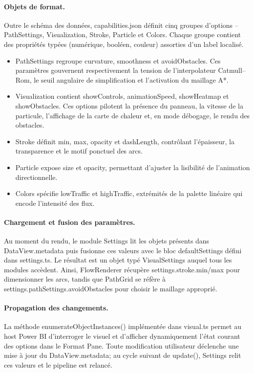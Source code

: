 \paragraph{Objets de format.} Outre le schéma des données, capabilities.json définit cinq groupes d’options – PathSettings, Visualization, Stroke, Particle et Colors. Chaque groupe contient des propriétés typées (numérique, booléen, couleur) assorties d’un label localisé.
\begin{itemize}
  \item PathSettings regroupe curvature, smoothness et avoidObstacles. Ces paramètres gouvernent respectivement la tension de l’interpolateur Catmull–Rom, le seuil angulaire de simplification et l’activation du maillage A*.
  \item Visualization contient showControls, animationSpeed, showHeatmap et showObstacles. Ces options pilotent la présence du panneau, la vitesse de la particule, l’affichage de la carte de chaleur et, en mode débogage, le rendu des obstacles.
  \item Stroke définit min, max, opacity et dashLength, contrôlant l’épaisseur, la transparence et le motif ponctuel des arcs.
  \item Particle expose size et opacity, permettant d’ajuster la lisibilité de l’animation directionnelle.
  \item Colors spécifie lowTraffic et highTraffic, extrémités de la palette linéaire qui encode l’intensité des flux.
\end{itemize}

\paragraph{Chargement et fusion des paramètres.} Au moment du rendu, le module Settings lit les objets présents dans DataView.metadata puis fusionne ces valeurs avec le bloc defaultSettings défini dans settings.ts. Le résultat est un objet typé VisualSettings auquel tous les modules accèdent. Ainsi, FlowRenderer récupère settings.stroke.min/max pour dimensionner les arcs, tandis que PathGrid se réfère à settings.pathSettings.avoidObstacles pour choisir le maillage approprié.

\paragraph{Propagation des changements.} La méthode enumerateObjectInstances() implémentée dans visual.ts permet au host Power BI d’interroger le visuel et d’afficher dynamiquement l’état courant des options dans le Format Pane. Toute modification utilisateur déclenche une mise à jour du DataView.metadata; au cycle suivant de update(), Settings relit ces valeurs et le pipeline est relancé. 

